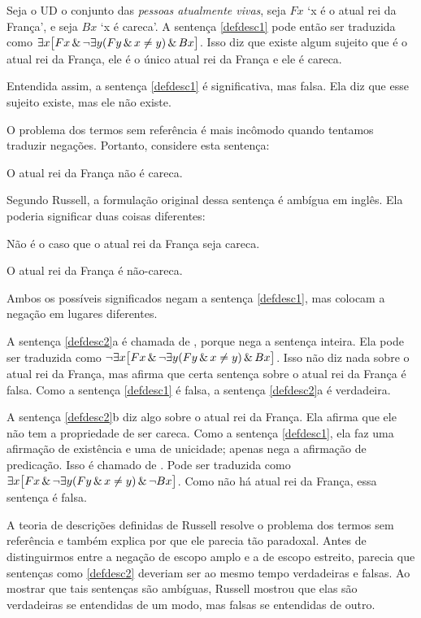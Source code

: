 Seja o UD o conjunto das \emph{pessoas atualmente vivas}, seja $Fx$ `x é o atual rei da França', e seja $Bx$ `x é careca'. A sentença \ref{defdesc1} pode então ser traduzida como $\exists x\bigl[Fx \,\&\, \neg\exists y(Fy \,\&\, x\neq y) \,\&\, Bx\bigr]$. Isso diz que existe algum sujeito que é o atual rei da França, ele é o único atual rei da França e ele é careca.

Entendida assim, a sentença \ref{defdesc1} é significativa, mas falsa. Ela diz que esse sujeito existe, mas ele não existe.

O problema dos termos sem referência é mais incômodo quando tentamos traduzir negações. Portanto, considere esta sentença:
\begin{earg}
\item[\ex{defdesc2}] O atual rei da França não é careca.
\end{earg}
Segundo Russell, a formulação original dessa sentença é ambígua em inglês. Ela poderia significar duas coisas diferentes:
\begin{earg}
\item[\ref{defdesc2}a.] Não é o caso que o atual rei da França seja careca.
\item[\ref{defdesc2}b.] O atual rei da França é não-careca.
\end{earg}
Ambos os possíveis significados negam a sentença \ref{defdesc1}, mas colocam a negação em lugares diferentes.

A sentença \ref{defdesc2}a é chamada de , porque nega a sentença inteira. Ela pode ser traduzida como $\neg\exists x\bigl[Fx \,\&\, \neg\exists y(Fy \,\&\, x\neq y) \,\&\, Bx\bigr]$. Isso não diz nada sobre o atual rei da França, mas afirma que certa sentença sobre o atual rei da França é falsa. Como a sentença \ref{defdesc1} é falsa, a sentença \ref{defdesc2}a é verdadeira.

A sentença \ref{defdesc2}b diz algo sobre o atual rei da França. Ela afirma que ele não tem a propriedade de ser careca. Como a sentença \ref{defdesc1}, ela faz uma afirmação de existência e uma de unicidade; apenas nega a afirmação de predicação. Isso é chamado de . Pode ser traduzida como $\exists x\bigl[Fx \,\&\, \neg\exists y(Fy \,\&\, x\neq y) \,\&\, \neg Bx\bigr]$. Como não há atual rei da França, essa sentença é falsa.

A teoria de descrições definidas de Russell resolve o problema dos termos sem referência e também explica por que ele parecia tão paradoxal. Antes de distinguirmos entre a negação de escopo amplo e a de escopo estreito, parecia que sentenças como \ref{defdesc2} deveriam ser ao mesmo tempo verdadeiras e falsas. Ao mostrar que tais sentenças são ambíguas, Russell mostrou que elas são verdadeiras se entendidas de um modo, mas falsas se entendidas de outro.

